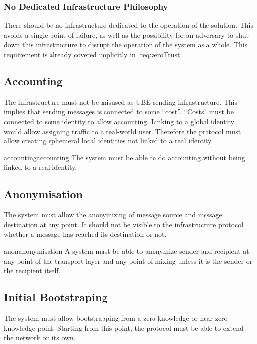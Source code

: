 \subsubsection{No Dedicated Infrastructure Philosophy}
There should be no infrastructure dedicated to the operation of the solution. This avoids a single point of failure, as well as the possibility for an adversary to shut down this infrastructure to disrupt the operation of the system as a whole. This requirement is already covered implicitly in \ref{req:zeroTrust}.

\subsection{Accounting}
The infrastructure must not be misused as UBE sending infrastructure. This implies that sending messages is connected to some ``cost''. ``Costs'' must be connected to some identity to allow accounting. Linking to a global identity would allow assigning traffic to a real-world user. Therefore the protocol must allow creating ephemeral local identities not linked to a real identity.

\begin{requirement}{accounting}{accounting}
	The system must be able to do accounting without being linked to a real identity.
\end{requirement}

\subsection{Anonymisation}
The system must allow the anonymizing of message source and message destination at any point. It should not be visible to the infrastructure protocol whether a message has reached its destination or not. 

\begin{requirement}{anon}{anonymisation}
    A system must be able to anonymize sender and recipient at any point of the transport layer and any point of mixing unless it is the sender or the recipient itself.
\end{requirement}

\subsection{Initial Bootstraping}
The system must allow bootstrapping from a zero knowledge or near zero knowledge point. Starting from this point, the protocol must be able to extend the network on its own.

